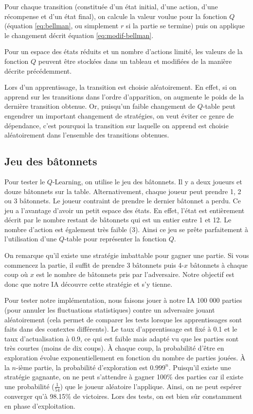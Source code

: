 Pour chaque transition (constituée d'un état initial, d'une action, d'une récompense et d'un état final), on calcule la valeur voulue pour la fonction $Q$ 
(équation \ref{eq:bellman}, ou simplement $r$ si la partie se termine) puis on applique le changement décrit équation \ref{eq:modif-bellman}.

Pour un espace des états réduits et un nombre d'actions limité, les valeurs de la fonction $Q$ peuvent être stockées dans un tableau et modifiées de la manière
décrite précédemment.

Lors d'un apprentissage, la transition est choisie aléatoirement. En effet, si on apprend sur les transitions dans l'ordre d'apparition, on augmente le poids de la
dernière transition obtenue. Or, puisqu'un faible changement de $Q$-table peut engendrer un important changement de stratégies, on veut éviter ce genre de dépendance,
c'est pourquoi la transition sur laquelle on apprend est choisie aléatoirement dans l'ensemble des transitions obtenues.


\subsection{Jeu des bâtonnets}

Pour tester le $Q$-Learning, on utilise le jeu des bâtonnets. Il y a deux joueurs et douze bâtonnets sur la table. Alternativement, chaque joueur peut prendre
1, 2 ou 3 bâtonnets. Le joueur contraint de prendre le dernier bâtonnet a perdu. Ce jeu a l'avantage d'avoir un petit espace des états. En effet, l'état est entièrement
décrit par le nombre restant de bâtonnets qui est un entier entre 1 et 12. Le nombre d'action est également très faible (3). Ainsi ce jeu se prête parfaitement à
l'utilisation d'une $Q$-table pour représenter la fonction $Q$.

On remarque qu'il existe une stratégie imbattable pour gagner une partie. Si vous commencez la partie, il suffit de prendre 3 bâtonnets puis 4-$x$ bâtonnets à chaque coup
où $x$ est le nombre de bâtonnets pris par l'adversaire. Notre objectif est donc que notre IA découvre cette stratégie et s'y tienne. 

Pour tester notre implémentation, nous faisons jouer à notre IA 100 000 parties (pour annuler les fluctuations statistiques) contre un adversaire jouant aléatoirement
(cela permet de comparer les tests lorsque les apprentissages sont faits dans des contextes différents). Le taux d'apprentissage est fixé à 0.1 et le taux d'actualisation
à 0.9, ce qui est faible mais adapté vu que les parties sont très courtes (moins de dix coups). À chaque coup, la probabilité d'être en exploration évolue 
exponentiellement en fonction du nombre de parties jouées. À la $n$-ième partie, la probabilité d'exploration est $0.999^n$. Puisqu'il existe une stratégie gagnante,
on ne peut s'attendre à gagner 100\% des parties car il existe une probabilité ($\frac{1}{54}$) que le joueur aléatoire l'applique. Ainsi, on ne peut espérer 
converger qu'à 98.15\% de victoires. Lors des tests, on est bien sûr constamment en phase d'exploitation.

